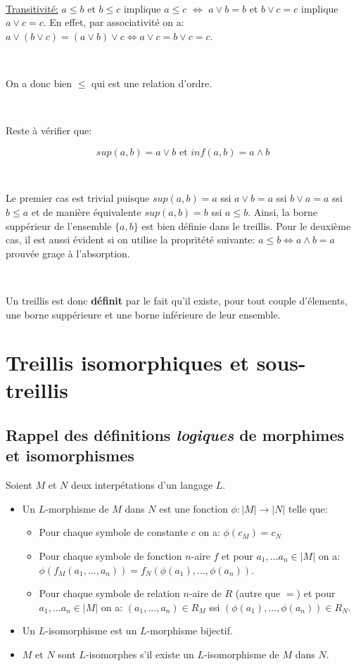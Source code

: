 \documentclass[a4paper, 11pt]{article}
\begin{document}
\

\underline{Transitivité:} $a \leq b$ et $b \leq c$ implique $a \leq c$ $\Leftrightarrow$ $a \lor b = b$ et $b \lor c = c$ implique $a \lor c = c$. En effet, par associativité on a: $a \lor (b \lor c) = (a \lor b) \lor c \Leftrightarrow a \lor c = b \lor c = c$.

\

On a donc bien $\leq$ qui est une relation d'ordre.

\

Reste à vérifier que:

$$sup(a,b) = a \lor b \text{ et } inf(a,b) = a \land b$$

\

Le premier cas est trivial puisque $sup(a,b) = a$ ssi $a \lor b = a$ ssi $b \lor a = a$ ssi $b \leq a$ et de manière équivalente $sup(a,b) = b$ ssi $a \leq b$. Ainsi, la borne suppérieur de l'ensemble $\{a,b\}$ est bien définie dans le treillis. Pour le deuxième cas, il est aussi évident si on utilise la propritété suivante: $a \leq b \Leftrightarrow a \land b = a$ prouvée graçe à l'absorption.

\

Un treillis est donc \textbf{définit} par le fait qu'il existe, pour tout couple d'élements, une borne suppérieure et une borne inférieure de leur ensemble.

\section{Treillis isomorphiques et sous-treillis}

\subsection{Rappel des définitions \textit{logiques} de morphimes et isomorphismes}

\begin{tcolorbox} 
    Soient $M$ et $N$ deux interpétations d'un langage $L$.
    
    \begin{itemize}
        \item Un $L$-morphisme de $M$ dans $N$ est une fonction $\phi: |M| \rightarrow |N|$ telle que:
        \begin{itemize}
            \item Pour chaque symbole de constante $c$ on a: $\phi(c_M) = c_N$
            \item Pour chaque symbole de fonction $n$-aire $f$ et pour $a_1, ... a_n \in |M|$ on a: $\phi(f_M(a_1,...,a_n)) = f_N(\phi(a_1), ..., \phi(a_n))$.
            \item Pour chaque symbole de relation $n$-aire de $R$ (autre que $=$) et pour $a_1, ... a_n \in |M|$ on a: $(a_1, ..., a_n) \in R_M$ ssi $(\phi(a_1), ..., \phi(a_n)) \in R_N$. 
        \end{itemize}
        \item Un $L$-isomorphisme est un $L$-morphisme bijectif.
        \item $M$ et $N$ sont $L$-isomorphes s'il existe un $L$-isomorphisme de $M$ dans $N$.
    \end{itemize}
\end{tcolorbox}
\end{document}
